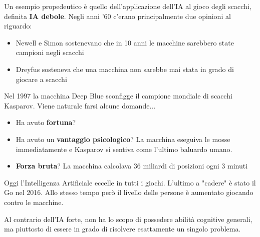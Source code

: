 \begin{center}
\end{center}

\begin{example}[Scacchi]
	Un esempio propedeutico è quello dell'applicazione dell'IA al gioco degli scacchi, definita \textbf{IA debole}. Negli anni '60 c'erano principalmente due opinioni al riguardo:
	\begin{itemize}
		\item Newell e Simon sostenevano che in 10 anni le macchine sarebbero state campioni negli scacchi
		\item Dreyfus sosteneva che una macchina non sarebbe mai stata in grado di giocare a scacchi
	\end{itemize}
	Nel 1997 la macchina Deep Blue sconfigge il campione mondiale di scacchi Kasparov. Viene naturale farsi alcune domande...
	\begin{itemize}
		\item Ha avuto \textbf{fortuna}?
		\item Ha avuto un \textbf{vantaggio psicologico}? La macchina eseguiva le mosse immediatamente e Kasparov si sentiva come l'ultimo baluardo umano.
		\item \textbf{Forza bruta}? La macchina calcolava 36 miliardi di posizioni ogni 3 minuti
	\end{itemize}
	Oggi l'Intelligenza Artificiale eccelle in tutti i giochi. L'ultimo a "cadere" è stato il Go nel 2016. Allo stesso tempo però il livello delle persone è aumentato giocando contro le macchine.
\end{example}

\begin{definition}[IA debole]
	Al contrario dell’IA forte, non ha lo scopo di possedere abilità cognitive generali, ma piuttosto di essere in grado di	risolvere esattamente un singolo problema.
\end{definition}

